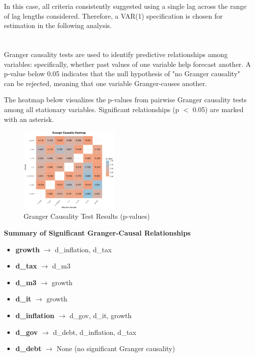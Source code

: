 \documentclass[a4paper,12pt]{article}
\begin{document}
In this case, all criteria consistently suggested using a single lag across the range of lag lengths considered. Therefore, a VAR(1) specification is chosen for estimation in the following analysis.



\section{}

Granger causality tests are used to identify predictive relationships among variables: specifically, whether past values of one variable help forecast another. A p-value below 0.05 indicates that the null hypothesis of "no Granger causality" can be rejected, meaning that one variable Granger-causes another.

The heatmap below visualizes the p-values from pairwise Granger causality tests among all stationary variables. Significant relationships (p $<$ 0.05) are marked with an asterisk.

\begin{figure}[H]
  \centering
  \includegraphics[width=0.44\textwidth]{../results/granger_causality_heatmap.png}
  \caption{Granger Causality Test Results (p-values)}
\end{figure}

\textbf{Summary of Significant Granger-Causal Relationships}

\begin{itemize}
  \item \textbf{growth} $\rightarrow$ d\_inflation, d\_tax
  \item \textbf{d\_tax} $\rightarrow$ d\_m3
  \item \textbf{d\_m3} $\rightarrow$ growth
  \item \textbf{d\_it} $\rightarrow$ growth
  \item \textbf{d\_inflation} $\rightarrow$ d\_gov, d\_it, growth
  \item \textbf{d\_gov} $\rightarrow$ d\_debt, d\_inflation, d\_tax
  \item \textbf{d\_debt} $\rightarrow$ None (no significant Granger causality)
\end{itemize}
\end{document}
